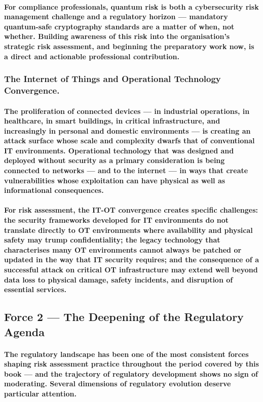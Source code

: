 \paragraph{For compliance professionals, quantum risk is both a cybersecurity risk management challenge and a regulatory horizon — mandatory quantum-safe cryptography standards are a matter of when, not whether. Building awareness of this risk into the organisation's strategic risk assessment, and beginning the preparatory work now, is a direct and actionable professional contribution.}
\subsubsection{The Internet of Things and Operational Technology Convergence.}
\paragraph{The proliferation of connected devices — in industrial operations, in healthcare, in smart buildings, in critical infrastructure, and increasingly in personal and domestic environments — is creating an attack surface whose scale and complexity dwarfs that of conventional IT environments. Operational technology that was designed and deployed without security as a primary consideration is being connected to networks — and to the internet — in ways that create vulnerabilities whose exploitation can have physical as well as informational consequences.}
\paragraph{For risk assessment, the IT-OT convergence creates specific challenges: the security frameworks developed for IT environments do not translate directly to OT environments where availability and physical safety may trump confidentiality; the legacy technology that characterises many OT environments cannot always be patched or updated in the way that IT security requires; and the consequence of a successful attack on critical OT infrastructure may extend well beyond data loss to physical damage, safety incidents, and disruption of essential services.}

\subsection{Force 2 — The Deepening of the Regulatory Agenda}
\paragraph{The regulatory landscape has been one of the most consistent forces shaping risk assessment practice throughout the period covered by this book — and the trajectory of regulatory development shows no sign of moderating. Several dimensions of regulatory evolution deserve particular attention.}
